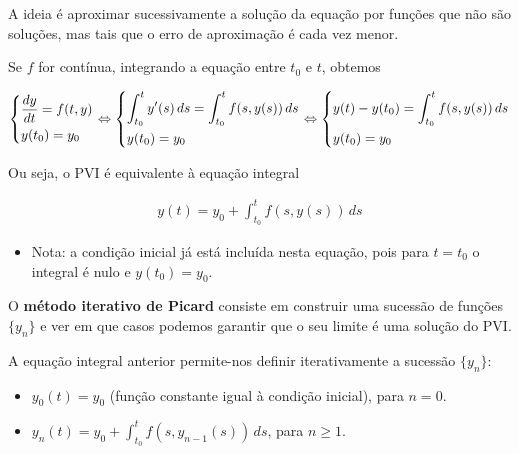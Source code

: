 \documentclass{article}
\begin{document}
\bigskip

A ideia é aproximar sucessivamente a solução da equação por funções que não são
soluções, mas tais que o erro de aproximação é cada vez menor.

\smallskip

Se $f$ for contínua, integrando a equação entre $t_0$ e $t$, obtemos

\begin{gather*}
\begin{dcases}
\frac{dy}{dt} = f(t, y) \\
y(t_0) = y_0
\end{dcases}
\Leftrightarrow
\begin{dcases}
\int_{t_0}^{t} y'(s) \, ds = \int_{t_0}^{t} f(s, y(s)) \, ds \\
y(t_0) = y_0
\end{dcases}
\Leftrightarrow
\begin{dcases}
y(t) - y(t_0) = \int_{t_0}^{t} f(s, y(s)) \, ds \\
y(t_0) = y_0
\end{dcases}
\end{gather*}

Ou seja, o PVI é equivalente à equação integral

\begin{gather*}
\boxed{y(t) = y_0 + \int_{t_0}^{t} f(s, y(s)) \, ds}
\end{gather*}

\begin{itemize}
    \item Nota: a condição inicial já está incluída nesta equação, pois para $t = t_0$ o integral é nulo e $y(t_0) = y_0$.
\end{itemize}

\smallskip

O \textbf{método iterativo de Picard} consiste em construir uma sucessão de funções $\{y_n\}$
e ver em que casos podemos garantir que o seu limite é uma solução do PVI.

\smallskip

A equação integral anterior permite-nos definir iterativamente a sucessão $\{y_n\}$:

\newpage

\begin{itemize}
    \item $y_0(t) = y_0$ (função constante igual à condição inicial), para $n = 0$.
    \item $y_n(t) = y_0 + \int_{t_0}^{t} f(s, y_{n-1}(s)) \, ds$, para $n \geq 1$.
\end{itemize}
\end{document}
